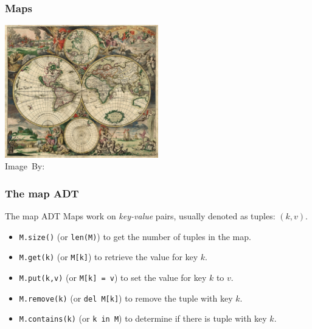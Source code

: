 \begin{frame}
	\frametitle{Maps}
	
	\begin{center}
		\includegraphics[width=0.5\textwidth]{images/world_map.JPG}\\
		\hspace*{15pt}\hbox{\scriptsize Image By:}
	\end{center}
\end{frame}

\begin{frame}
	\frametitle{The map ADT}
	
		\begin{block}{The map ADT}
			Maps work on \textit{key-value} pairs, usually denoted as tuples: $(k,v)$.
			\pause
			\begin{itemize}
				\item \texttt{M.size()} (or \texttt{len(M)}) to get the number of tuples in the map.
					\pause
				\item \texttt{M.get(k)} (or \texttt{M[k]}) to retrieve the value for key $k$.
				\item \texttt{M.put(k,v)} (or \texttt{M[k] = v}) to set the value for key $k$ to $v$.
					\pause
				\item \texttt{M.remove(k)} (or \texttt{del M[k]}) to remove the tuple with key $k$.
					\pause
				\item \texttt{M.contains(k)} (or \texttt{k in M}) to determine if there is tuple with key $k$.
			\end{itemize}
		\end{block}	
\end{frame}

